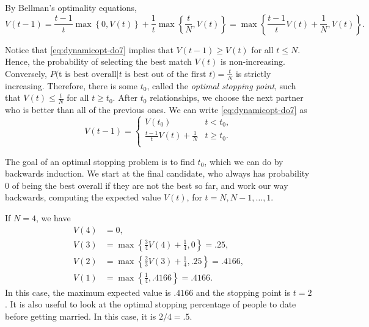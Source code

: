 By Bellman's optimality equations,
\begin{equation}
\label{eq:dynamicopt-do7}
V(t-1) = \frac{t-1}{t}\max\left\{0,V(t)\right\}+\frac{1}{t}\max\left\{ \frac{t}{N},V(t)\right\} = \max\left\{\frac{t-1}{t}V(t)+\frac{1}{N},V(t)\right\}.
\end{equation}

Notice that \eqref{eq:dynamicopt-do7} implies that $V(t-1)\geq V(t)$ for all $t\leq N$.
Hence, the probability of selecting the best match $V(t)$ is non-increasing.
Conversely, $P($t$ \text{ is best overall}|\text{$t$ is best out of the first $t$})=\frac{t}{N}$ is strictly increasing.
Therefore, there is some $t_0$, called the \emph{optimal stopping point}, such that $V(t)\leq\frac{t}{N}$ for all $t\geq t_0$.
After $t_0$ relationships, we choose the next partner who is better than all of the previous ones.
We can write \eqref{eq:dynamicopt-do7} as
\[
V(t-1) =
    \begin{cases}
    V(t_0) & t<t_0,\\
    \frac{t-1}{t}V(t)+\frac{1}{N} & t\geq t_0.\\
    \end{cases}
\]

The goal of an optimal stopping problem is to find $t_0$, which we can do by backwards induction.
We start at the final candidate, who always has probability $0$ of being the best overall if they are not the best so far, and work our way backwards, computing the expected value $V(t)$, for $t=N,N-1,\ldots,1$.

If $N=4$, we have
\begin{align*}
V(4) &= 0, \\
V(3) &= \max\left\{\frac{3}{4}V(4)+\frac{1}{4},0\right\} = .25,\\
V(2) &= \max\left\{\frac{2}{3}V(3)+\frac{1}{4},.25\right\} = .4166,\\
V(1) &= \max\left\{\frac{1}{4},.4166\right\}= .4166.
\end{align*}
In this case, the maximum expected value is $.4166$ and the stopping point is $t=2$.
It is also useful to look at the optimal stopping percentage of people to date before getting married. 
In this case, it is $2/4=.5$.

